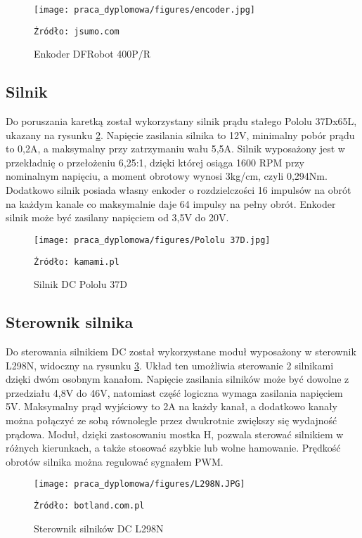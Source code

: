 \begin{figure}
    \centering
    \texttt{[image: praca\_dyplomowa/figures/encoder.jpg]}
    \caption{Enkoder DFRobot 400P/R}
    \texttt{Źródło: jsumo.com}
    \label{fig:Enkoder}
\end{figure}

\subsection{Silnik}
Do poruszania karetką został wykorzystany silnik prądu stałego Pololu 37Dx65L, ukazany na rysunku \ref{fig:Silnik}. Napięcie zasilania silnika to 12V, minimalny pobór prądu to 0,2A, a maksymalny przy zatrzymaniu wału 5,5A. Silnik wyposażony jest w przekładnię o przełożeniu 6,25:1, dzięki której osiąga 1600 RPM przy nominalnym napięciu, a moment obrotowy wynosi 3kg/cm, czyli 0,294Nm. Dodatkowo silnik posiada własny enkoder o rozdzielczości 16 impulsów na obrót na każdym kanale co maksymalnie daje 64 impulsy na pełny obrót. Enkoder silnik może być zasilany napięciem od 3,5V do 20V. 

\begin{figure}
    \centering
    \texttt{[image: praca\_dyplomowa/figures/Pololu 37D.jpg]}
    \caption{Silnik DC Pololu 37D}
    \texttt{Źródło: kamami.pl}
    \label{fig:Silnik}
\end{figure}

\subsection{Sterownik silnika}
Do sterowania silnikiem DC został wykorzystane moduł wyposażony w sterownik L298N, widoczny na rysunku \ref{fig:L298N}. Układ ten umożliwia sterowanie 2 silnikami dzięki dwóm osobnym kanałom. Napięcie zasilania silników może być dowolne z przedziału 4,8V do 46V, natomiast część logiczna wymaga zasilania napięciem 5V. Maksymalny prąd wyjściowy to 2A na każdy kanał, a dodatkowo kanały można połączyć ze sobą równolegle przez dwukrotnie zwiększy się wydajność prądowa. Moduł, dzięki zastosowaniu mostka H, pozwala sterować silnikiem w różnych kierunkach, a także stosować szybkie lub wolne hamowanie. Prędkość obrotów silnika można regulować sygnałem PWM.

\begin{figure}
    \centering
    \texttt{[image: praca\_dyplomowa/figures/L298N.JPG]}
    \caption{Sterownik silników DC L298N}
    \texttt{Źródło: botland.com.pl}
    \label{fig:L298N}
\end{figure}

